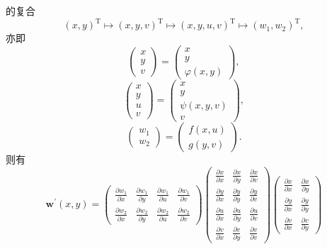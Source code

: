 的复合
\[
{\left( x,y\right) }^{\mathrm{T}} \mapsto  {\left( x,y,v\right) }^{\mathrm{T}} \mapsto  {\left( x,y,u,v\right) }^{\mathrm{T}} \mapsto  {\left( {w}_{1},{w}_{2}\right) }^{\mathrm{T}},
\]
亦即
\[
\left( \begin{array}{l} x \\  y \\  v \end{array}\right)  = \left( \begin{matrix} x \\  y \\  \varphi \left( {x,y}\right)  \end{matrix}\right) ,
\]
\[
\left( \begin{array}{l} x \\  y \\  u \\  v \end{array}\right)  = \left( \begin{matrix} x \\  y \\  \psi \left( {x,y,v}\right) \\  v \end{matrix}\right) ,
\]
\[
\left( \begin{array}{l} {w}_{1} \\  {w}_{2} \end{array}\right)  = \left( \begin{array}{l} f\left( {x,u}\right) \\  g\left( {y,v}\right)  \end{array}\right) .
\]
则有
\[
{\mathbf{w}}^{\prime }\left( {x,y}\right)  = \left( \begin{array}{llll} \frac{\partial {w}_{1}}{\partial x} & \frac{\partial {w}_{1}}{\partial y} & \frac{\partial {w}_{1}}{\partial u} & \frac{\partial {w}_{1}}{\partial v} \\  \frac{\partial {w}_{2}}{\partial x} & \frac{\partial {w}_{2}}{\partial y} & \frac{\partial {w}_{2}}{\partial u} & \frac{\partial {w}_{2}}{\partial v} \end{array}\right) \left( \begin{array}{lll} \frac{\partial x}{\partial x} & \frac{\partial x}{\partial y} & \frac{\partial x}{\partial v} \\  \frac{\partial y}{\partial x} & \frac{\partial y}{\partial y} & \frac{\partial y}{\partial v} \\  \frac{\partial u}{\partial x} & \frac{\partial u}{\partial y} & \frac{\partial u}{\partial v} \\  \frac{\partial v}{\partial x} & \frac{\partial v}{\partial y} & \frac{\partial v}{\partial v} \end{array}\right) \left( \begin{array}{ll} \frac{\partial x}{\partial x} & \frac{\partial x}{\partial y} \\  \frac{\partial y}{\partial x} & \frac{\partial y}{\partial y} \\  \frac{\partial v}{\partial x} & \frac{\partial v}{\partial y} \end{array}\right)
\]
